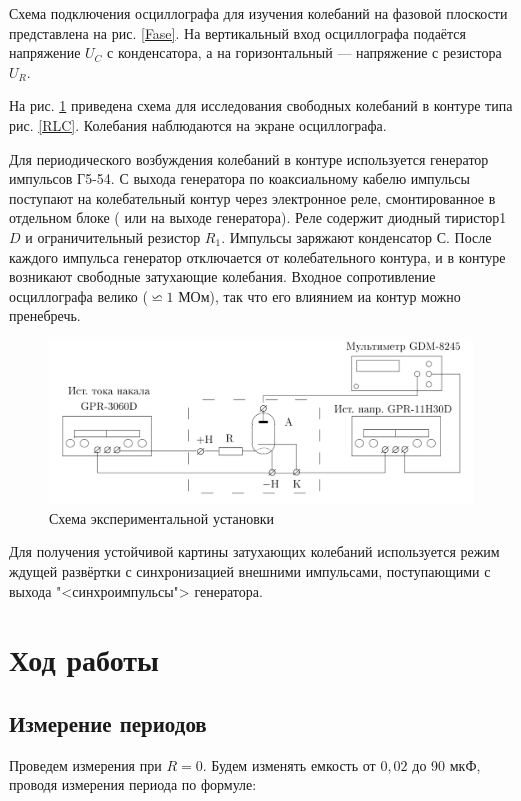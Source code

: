 \documentclass[12pt]{kiarticle}
\begin{document}
Схема подключения осциллографа для изучения колебаний на фазовой плоскости представлена на рис. \ref{Fase}. На вертикальный вход осциллографа подаётся напряжение $ U_C $ с конденсатора, а на горизонтальный --- напряжение с резистора $ U_R $.

На рис. \ref{lab} приведена схема для исследования свободных колебаний в контуре типа рис. \ref{RLC}. Колебания наблюдаются на экране осциллографа.

Для периодического возбуждения колебаний в контуре используется
генератор импульсов Г5-54. С выхода генератора по коаксиальному кабелю импульсы поступают на колебательный контур через электронное
реле, смонтированное в отдельном блоке ( или на выходе генератора).
Реле содержит диодный тиристор1 $ D $ и ограничительный резистор $ R_1 $.
Импульсы заряжают конденсатор $ С $. После каждого импульса генератор
отключается от колебательного контура, и в контуре возникают
свободные затухающие колебания. Входное сопротивление осциллографа
велико ($ \backsimeq 1$ МОм), так что его влиянием иа контур можно пренебречь.

\begin{figure}[h]
	\includegraphics[width=15cm]{lab}
	\caption{Схема экспериментальной установки}
	\label{lab}
\end{figure}

Для получения устойчивой картины затухающих колебаний используется
режим ждущей развёртки с синхронизацией внешними импульсами,
поступающими с выхода "<синхроимпульсы"> генератора.

\section{Ход работы}

\subsection{Измерение периодов}

Проведем измерения при $ R = 0 $. Будем изменять емкость от $ 0,02 $ до 90 мкФ, проводя измерения периода по формуле:
\end{document}
